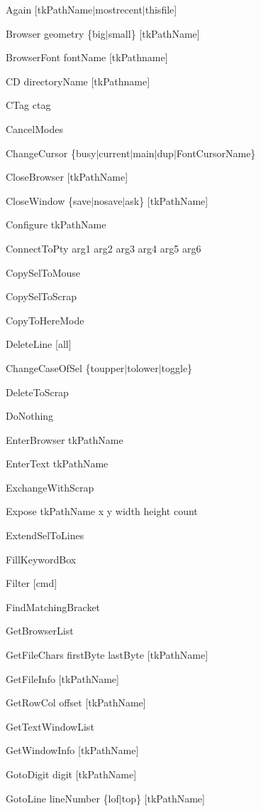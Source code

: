 \begin{description}

\item {Again [tkPathName$\mid$mostrecent$\mid$thisfile]}
\item {Browser geometry \{big$\mid$small\} [tkPathName]}
\item {BrowserFont fontName [tkPathname]}
\item {CD directoryName [tkPathname]}
\item {CTag ctag}
\item {CancelModes}
\item {ChangeCursor
	\{busy$\mid$current$\mid$main$\mid$dup$\mid$FontCursorName\}}
\item {CloseBrowser [tkPathName]}
\item {CloseWindow \{save$\mid$nosave$\mid$ask\} [tkPathName]}
\item {Configure tkPathName}
\item {ConnectToPty arg1 arg2 arg3 arg4 arg5 arg6}
\item {CopySelToMouse}
\item {CopySelToScrap}
\item {CopyToHereMode}
\item {DeleteLine [all]}
\item {ChangeCaseOfSel \{toupper$\mid$tolower$\mid$toggle\}}
\item {DeleteToScrap}
\item {DoNothing}
\item {EnterBrowser tkPathName}
\item {EnterText tkPathName}
\item {ExchangeWithScrap}
\item {Expose tkPathName x y width height count}
\item {ExtendSelToLines}
\item {FillKeywordBox}
\item {Filter [cmd]}
\item {FindMatchingBracket}
\item {GetBrowserList}
\item {GetFileChars firstByte lastByte [tkPathName]}
\item {GetFileInfo [tkPathName]}
\item {GetRowCol offset [tkPathName]}
\item {GetTextWindowList}
\item {GetWindowInfo [tkPathName]}
\item {GotoDigit digit [tkPathName]}
\item {GotoLine lineNumber \{lof$\mid$top\} [tkPathName]}

\end{description}

